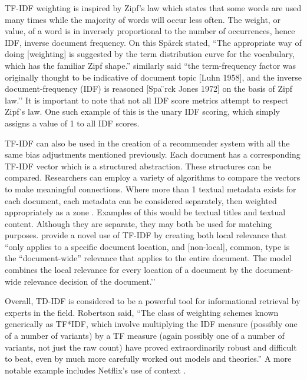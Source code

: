 TF-IDF weighting is inspired by Zipf's law which states that some words are used many times while the majority of words will occur less often. The weight, or value, of a word is in inversely proportional to the number of occurrences, hence IDF, inverse document frequency. On this Spärck stated, ``The appropriate way of doing [weighting] is suggested by the term distribution curve for the vocabulary, which has the familiar Zipf shape.'' \citep{Wu:2008:Interpreting_tf_idf_term_weights} similarly said ``the term-frequency factor was originally thought to be indicative of document topic [Luhn 1958], and the inverse document-frequency (IDF) is reasoned [Spa ̈rck Jones 1972] on the basis of Zipf law.’’ It is important to note that not all IDF score metrics attempt to respect Zipf's law. One such example of this is the unary IDF scoring, which simply assigns a value of 1 to all IDF scores.

TF-IDF can also be used in the creation of a recommender system with all the same bias adjustments mentioned previously. Each document has a corresponding TF-IDF vector which is a structured abstraction. These structures can be compared. Researchers can employ a variety of algorithms to compare the vectors to make meaningful connections. %
Where more than 1 textual metadata exists for each document, each metadata can be considered separately, then weighted appropriately as a zone \citep{manning_raghavan_2008_scoring}. Examples of this would be textual titles and textual content. Although they are separate, they may both be used for matching purposes. \citet{Wu:2008:Interpreting_tf_idf_term_weights} provide a novel use of TF-IDF by creating both local relevance that ``only applies to a specific document location, and [non-local], common, type is the ``document-wide'' relevance that applies to the entire document. The model combines the local relevance for every location of a document by the document-wide relevance decision of the document.’’

Overall, TD-IDF is considered to be a powerful tool for informational retrieval by experts in the field. Robertson \citeyearpar{understanding_idf_2004} said, ``The class of weighting schemes known generically as TF*IDF, which involve multiplying the IDF measure (possibly one of a number of variants) by a TF measure (again possibly one of a number of variants, not just the raw count) have proved extraordinarily robust and difficult to beat, even by much more carefully worked out models and theories.'' A more notable example includes Netflix’s use of context \citep{Bell:2007:lessons_from_the_netflix_prize}.

